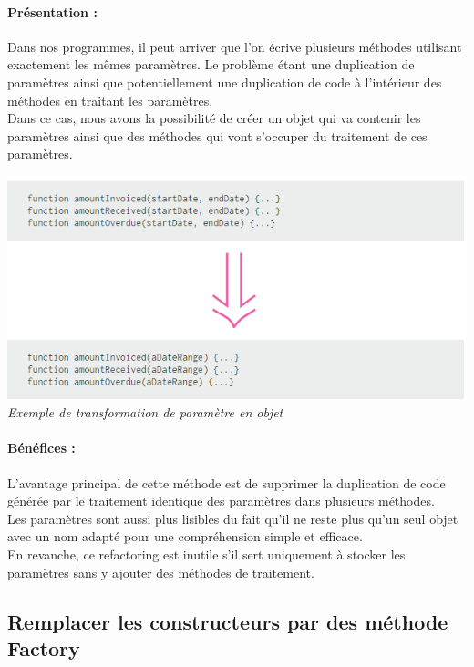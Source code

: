 \documentclass[a4paper,twoside,12pt,openright]{report}
\begin{document}
\paragraph{Présentation :}
Dans nos programmes, il peut arriver que l'on écrive plusieurs méthodes utilisant exactement les mêmes paramètres. Le problème étant une duplication de paramètres ainsi que potentiellement une duplication de code à l'intérieur des méthodes en traitant les paramètres.\\
Dans ce cas, nous avons la possibilité de créer un objet qui va contenir les paramètres ainsi que des méthodes qui vont s'occuper du traitement de ces paramètres.\\

\begin{center}
\includegraphics[scale=1]{Image/Ajout_Objet_Parametre.png}\\
\itshape{Exemple de transformation de paramètre en objet \cite{ref8}}
\end{center}

\paragraph{Bénéfices :}
L'avantage principal de cette méthode est de supprimer la duplication de code générée par le traitement identique des paramètres dans plusieurs méthodes.\\
Les paramètres sont aussi plus lisibles du fait qu'il ne reste plus qu'un seul objet avec un nom adapté pour une compréhension simple et efficace.\\
En revanche, ce refactoring est inutile s'il sert uniquement à stocker les paramètres sans y ajouter des méthodes de traitement.\\

\subsection{Remplacer les constructeurs par des méthode Factory}
\end{document}
